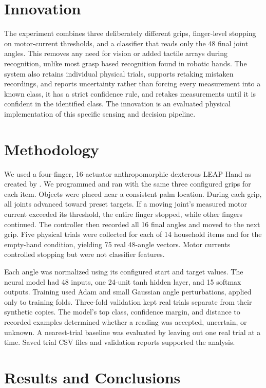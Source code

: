 \documentclass[authoryear,11pt]{elsarticle}
\begin{document}
\section{Innovation}

The experiment combines three deliberately different grips,
finger-level stopping on motor-current thresholds, and a classifier
that reads only the 48 final joint angles. This removes any need for
vision or added tactile arrays during recognition, unlike most grasp based recognition found in robotic hands. The system also
retains individual physical trials, supports retaking mistaken
recordings, and reports uncertainty rather than forcing every
measurement into a known class, it has a strict confidence rule, and retakes measurements until it is confident in the identified class.
The innovation is an evaluated physical implementation of this specific sensing and decision pipeline.

\section{Methodology}

We used a four-finger, 16-actuator anthropomorphic dexterous LEAP Hand as created by \citet{ShawAgarwalPathak2023}.
We programmed and ran with the same three
configured grips for each item. Objects were placed near a consistent
palm location. During each grip, all joints advanced toward preset
targets. If a moving joint's measured motor current exceeded its
threshold, the entire finger stopped, while other fingers continued.
The controller then recorded all 16 final angles and moved to the
next grip. Five physical trials were collected for each of 14
household items and for the empty-hand condition, yielding 75 real
48-angle vectors. Motor currents controlled stopping but were not
classifier features.

Each angle was normalized using its configured start and target
values. The neural model had 48 inputs, one 24-unit tanh hidden layer,
and 15 softmax outputs. Training used Adam and small Gaussian angle
perturbations, applied only to training folds. Three-fold validation
kept real trials separate from their synthetic copies. The model's
top class, confidence margin, and distance to recorded examples
determined whether a reading was accepted, uncertain, or unknown.
A nearest-trial baseline was evaluated by leaving out one real trial
at a time. Saved trial CSV files and validation reports supported the
analysis.

\section{Results and Conclusions}
\end{document}
